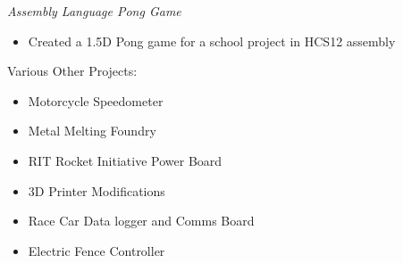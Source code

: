 \documentclass[line,mmmargin]{res}
\begin{document}
\begin{resume}
	\vspace{-10pt}
	{\sl Assembly Language Pong Game}
		\begin{itemize} \itemsep -2pt
			\item Created a 1.5D Pong game for a school project in HCS12 assembly
		\end{itemize}
	\vspace{-10pt}
	{Various Other Projects:}
		\begin{multicols}{2}
			\begin{itemize}
				\itemsep -2pt
				\item[] Motorcycle Speedometer
				\item[] Metal Melting Foundry
				\item[] RIT Rocket Initiative Power Board
				\item[] 3D Printer Modifications
				\item[] Race Car Data logger and Comms Board
				\item[] Electric Fence Controller
			\end{itemize}
		\end{multicols}


\end{resume}
\end{document}
